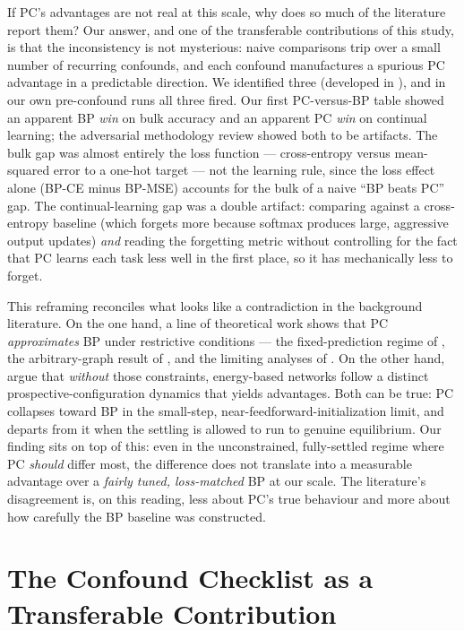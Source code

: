 If PC's advantages are not real at this scale, why does so much of the literature report them? Our
answer, and one of the transferable contributions of this study, is that the inconsistency is not
mysterious: naive comparisons trip over a small number of recurring confounds, and each confound
manufactures a spurious PC advantage in a predictable direction. We identified three (developed in
), and in our own pre-confound runs all three fired. Our first
PC-versus-BP table showed an apparent BP \emph{win} on bulk accuracy and an apparent PC \emph{win}
on continual learning; the adversarial methodology review showed both to be artifacts. The bulk gap
was almost entirely the loss function --- cross-entropy versus mean-squared error to a one-hot
target --- not the learning rule, since the loss effect alone (BP-CE minus BP-MSE) accounts for the
bulk of a naive ``BP beats PC'' gap. The continual-learning gap was a double artifact: comparing
against a cross-entropy baseline (which forgets more because softmax produces large, aggressive
output updates) \emph{and} reading the forgetting metric without controlling for the fact that PC
learns each task less well in the first place, so it has mechanically less to forget.

This reframing reconciles what looks like a contradiction in the background literature. On the one
hand, a line of theoretical work shows that PC \emph{approximates} BP under restrictive conditions
--- the fixed-prediction regime of \citet{whittington2017approximation}, the arbitrary-graph result
of \citet{millidge2022backprop}, and the limiting analyses of \citet{innocenti2026limits}. On the
other hand, \citet{song2024prospective} argue that \emph{without} those constraints, energy-based
networks follow a distinct prospective-configuration dynamics that yields advantages. Both can be
true: PC collapses toward BP in the small-step, near-feedforward-initialization limit, and departs
from it when the settling is allowed to run to genuine equilibrium. Our finding sits on top of this:
even in the unconstrained, fully-settled regime where PC \emph{should} differ most, the difference
does not translate into a measurable advantage over a \emph{fairly tuned, loss-matched} BP at our
scale. The literature's disagreement is, on this reading, less about PC's true behaviour and more
about how carefully the BP baseline was constructed.

\section{The Confound Checklist as a Transferable Contribution}\label{sec:disc-checklist}


